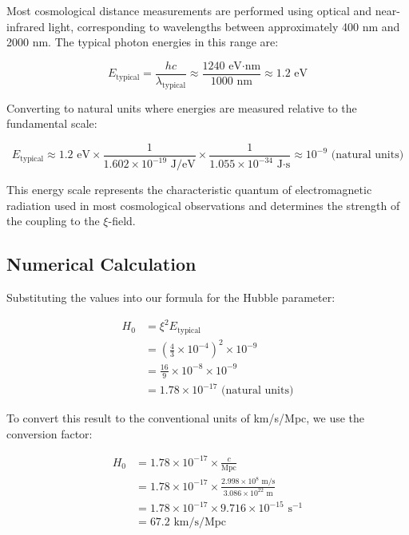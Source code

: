\documentclass[12pt,a4paper]{article}
\begin{document}
	Most cosmological distance measurements are performed using optical and near-infrared light, corresponding to wavelengths between approximately 400 nm and 2000 nm. The typical photon energies in this range are:
	
	\begin{equation}
		E_{\text{typical}} = \frac{hc}{\lambda_{\text{typical}}} \approx \frac{1240 \text{ eV·nm}}{1000 \text{ nm}} \approx 1.2 \text{ eV}
	\end{equation}
	
	Converting to natural units where energies are measured relative to the fundamental scale:
	
	\begin{equation}
		E_{\text{typical}} \approx 1.2 \text{ eV} \times \frac{1}{1.602 \times 10^{-19} \text{ J/eV}} \times \frac{1}{1.055 \times 10^{-34} \text{ J·s}} \approx 10^{-9} \text{ (natural units)}
	\end{equation}
	
	This energy scale represents the characteristic quantum of electromagnetic radiation used in most cosmological observations and determines the strength of the coupling to the $\xi$-field.
	
	\subsection{Numerical Calculation}
	
	Substituting the values into our formula for the Hubble parameter:
	
	\begin{align}
		H_0 &= \xi^2 E_{\text{typical}} \\
		&= \left(\frac{4}{3} \times 10^{-4}\right)^2 \times 10^{-9} \\
		&= \frac{16}{9} \times 10^{-8} \times 10^{-9} \\
		&= 1.78 \times 10^{-17} \text{ (natural units)}
	\end{align}
	
	To convert this result to the conventional units of km/s/Mpc, we use the conversion factor:
	
	\begin{align}
		H_0 &= 1.78 \times 10^{-17} \times \frac{c}{\text{Mpc}} \\
		&= 1.78 \times 10^{-17} \times \frac{2.998 \times 10^8 \text{ m/s}}{3.086 \times 10^{22} \text{ m}} \\
		&= 1.78 \times 10^{-17} \times 9.716 \times 10^{-15} \text{ s}^{-1} \\
		&= 67.2 \text{ km/s/Mpc}
	\end{align}
	
\end{document}
